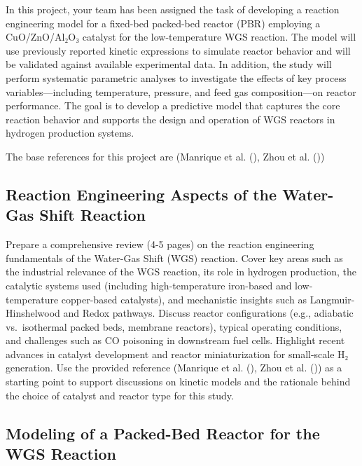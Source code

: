 \documentclass[
  12pt,
  a4paperpaper,
  DIV=11,
  numbers=noendperiod]{scrartcl}
\begin{document}
In this project, your team has been assigned the task of developing a
reaction engineering model for a fixed-bed packed-bed reactor (PBR)
employing a CuO/ZnO/Al₂O₃ catalyst for the low-temperature WGS reaction.
The model will use previously reported kinetic expressions to simulate
reactor behavior and will be validated against available experimental
data. In addition, the study will perform systematic parametric analyses
to investigate the effects of key process variables---including
temperature, pressure, and feed gas composition---on reactor
performance. The goal is to develop a predictive model that captures the
core reaction behavior and supports the design and operation of WGS
reactors in hydrogen production systems.

The base references for this project are (Manrique et al.
(), Zhou et al.
())

\subsection{Reaction Engineering Aspects of the Water-Gas Shift
Reaction}\label{reaction-engineering-aspects-of-the-water-gas-shift-reaction}

Prepare a comprehensive review (4-5 pages) on the reaction engineering
fundamentals of the Water-Gas Shift (WGS) reaction. Cover key areas such
as the industrial relevance of the WGS reaction, its role in hydrogen
production, the catalytic systems used (including high-temperature
iron-based and low-temperature copper-based catalysts), and mechanistic
insights such as Langmuir-Hinshelwood and Redox pathways. Discuss
reactor configurations (e.g., adiabatic vs.~isothermal packed beds,
membrane reactors), typical operating conditions, and challenges such as
CO poisoning in downstream fuel cells. Highlight recent advances in
catalyst development and reactor miniaturization for small-scale H₂
generation. Use the provided reference (Manrique et al.
(), Zhou et al.
()) as a starting point to support
discussions on kinetic models and the rationale behind the choice of
catalyst and reactor type for this study.

\subsection{Modeling of a Packed-Bed Reactor for the WGS
Reaction}\label{modeling-of-a-packed-bed-reactor-for-the-wgs-reaction}
\end{document}
